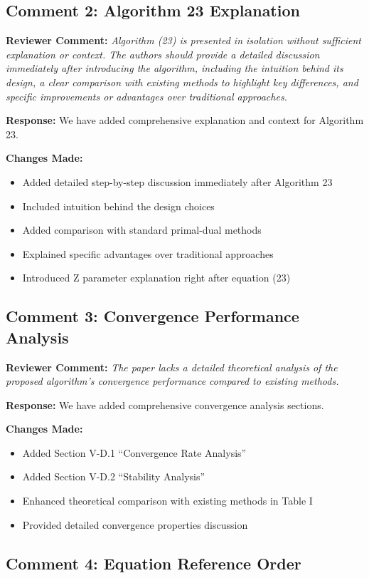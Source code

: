 \documentclass[11pt]{article}
\newcommand{\reviewercomment}[1]{\textbf{Reviewer Comment:} \textit{#1}}
\newcommand{\response}[1]{\textbf{Response:} #1}
\newcommand{\changes}[1]{\textbf{Changes Made:} #1}
\begin{document}
\subsection*{Comment 2: Algorithm 23 Explanation}

\reviewercomment{Algorithm (23) is presented in isolation without sufficient explanation or context. The authors should provide a detailed discussion immediately after introducing the algorithm, including the intuition behind its design, a clear comparison with existing methods to highlight key differences, and specific improvements or advantages over traditional approaches.}

\response{We have added comprehensive explanation and context for Algorithm 23.}

\changes{
\begin{itemize}
\item Added detailed step-by-step discussion immediately after Algorithm 23
\item Included intuition behind the design choices
\item Added comparison with standard primal-dual methods
\item Explained specific advantages over traditional approaches
\item Introduced Z parameter explanation right after equation (23)
\end{itemize}
}

\subsection*{Comment 3: Convergence Performance Analysis}

\reviewercomment{The paper lacks a detailed theoretical analysis of the proposed algorithm's convergence performance compared to existing methods.}

\response{We have added comprehensive convergence analysis sections.}

\changes{
\begin{itemize}
\item Added Section V-D.1 ``Convergence Rate Analysis''
\item Added Section V-D.2 ``Stability Analysis''
\item Enhanced theoretical comparison with existing methods in Table I
\item Provided detailed convergence properties discussion
\end{itemize}
}

\subsection*{Comment 4: Equation Reference Order}
\end{document}

